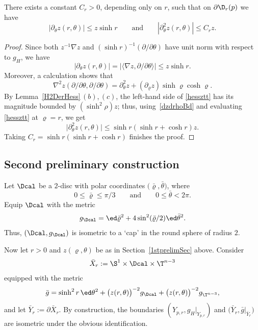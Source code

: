 \begin{Lemma}\label{dthetazEst}
	There exists a constant $C_r>0$, depending only on $r$, such that on $\partial\D_r(p)$ we have
	\begin{equation*}
		\left|\partial_\theta z (r,\theta)\right| \le z \sinh r \qquad
		\mbox{and}\qquad
		\left|\partial_\theta^2 z(r,\theta)\right| \le C_r z.
	\end{equation*}
\end{Lemma}
\begin{proof}
	Since both $z^{-1}\nabla z$ and $(\sinh r)^{-1}(\partial/\partial\theta)$
	have unit norm with respect to $g_{H}$, we have
	\[
		|\partial_\theta z(r,\theta)| = \left|\bigl\langle\nabla z, \partial/\partial\theta\bigr\rangle\right|
		\le z\sinh r.
	\]
	Moreover, a calculation shows that
	\begin{equation}\label{hessztt}
		\nabla^2 z (\partial/\partial\theta,\partial/\partial\theta)
		= \partial_\theta^2 z  +(\partial_\varrho z) \sinh \varrho \cosh \varrho.
	\end{equation}
	By Lemma~\ref{H2DerHess}\,$(b)$,\,$(c)$, the left-hand side of \eqref{hessztt} has its magnitude bounded
	by $(\sinh^2\rho)z$; thus, using~\eqref{dzdrhoBd} and evaluating
	\eqref{hessztt} at $\varrho = r$, we get
	\[
		\big|\partial_\theta^2 z(r,\theta)\big| \le \sinh r (\sinh r + \cosh r) z.
	\]
	Taking $C_r  = \sinh r(\sinh r + \cosh r)$ finishes the proof.
\end{proof}


\subsection{Second preliminary construction}\label{2ndprelimSec}
Let $\Dcal$ be a $2$-disc with polar coordinates $\bigl(\bar\varrho,\bar\theta\bigr)$, where
\[
	0\le \bar\varrho\le \pi/3 \qquad \mbox{and}\qquad 0\le \bar \theta<2\pi.
\]
Equip $\Dcal$ with the metric
\[
	g_\Dcal = \ed\bar\varrho^2 + 4\sin^2(\bar\varrho/2)\ed\bar\theta^2.
\]
Thus, $(\Dcal, g_\Dcal)$ is isometric to a `cap' in the round sphere of radius $2$.

Now let $r >0$ and $z(\varrho,\theta)$ be as in Section~\ref{1stprelimSec} above. Consider
\begin{equation*}
	\bar X_r := \S^1 \times \Dcal \times \T^{n-3}
\end{equation*}
equipped with the metric
\begin{equation}\label{barg}
\bar g =\sinh^ 2r \,\ed\theta^2 +\bigl(z(r,\theta)\bigr)^{-2} g_\Dcal+\bigl(z(r,\theta)\bigr)^{-2}g_{\T^{n-3}},
\end{equation}
and let $\bar Y_r := \partial \bar X_r$.
By construction, the boundaries $(Y_{p,r}, g_H|_{Y_{p,r}})$ and $\bigl(\bar Y_r, \bar g|_{\bar Y_r}\bigr)$ are isometric under the obvious identification.


